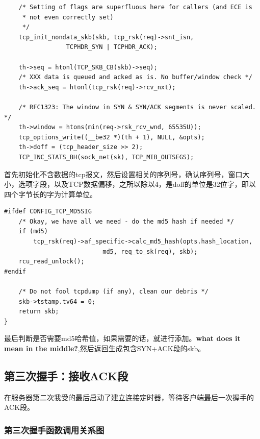 \begin{verbatim}
    /* Setting of flags are superfluous here for callers (and ECE is
     * not even correctly set)
     */
    tcp_init_nondata_skb(skb, tcp_rsk(req)->snt_isn,
                 TCPHDR_SYN | TCPHDR_ACK);

    th->seq = htonl(TCP_SKB_CB(skb)->seq);
    /* XXX data is queued and acked as is. No buffer/window check */
    th->ack_seq = htonl(tcp_rsk(req)->rcv_nxt);

    /* RFC1323: The window in SYN & SYN/ACK segments is never scaled. */
    th->window = htons(min(req->rsk_rcv_wnd, 65535U));
    tcp_options_write((__be32 *)(th + 1), NULL, &opts);
    th->doff = (tcp_header_size >> 2);
    TCP_INC_STATS_BH(sock_net(sk), TCP_MIB_OUTSEGS);
\end{verbatim}

                首先初始化不含数据的tcp报文，然后设置相关的序列号，确认序列号，窗口大小，选项字段，以及TCP数据偏移，之所以除以4，是doff的单位是32位字，即以四个字节长的字为计算单位。
                
\begin{verbatim}
#ifdef CONFIG_TCP_MD5SIG
    /* Okay, we have all we need - do the md5 hash if needed */
    if (md5)
        tcp_rsk(req)->af_specific->calc_md5_hash(opts.hash_location,
                           md5, req_to_sk(req), skb);
    rcu_read_unlock();
#endif

    /* Do not fool tcpdump (if any), clean our debris */
    skb->tstamp.tv64 = 0;
    return skb;
}
\end{verbatim}

                最后判断是否需要md5哈希值，如果需要的话，就进行添加。\textbf{what does it mean in the middle?},然后返回生成包含SYN+ACK段的skb。     

        \subsection{第三次握手：接收ACK段}

			在服务器第二次我受的最后启动了建立连接定时器，等待客户端最后一次握手的ACK段。           
			\subsubsection{第三次握手函数调用关系图}
				\begin{figure}[htb]        
				\end{figure}  
